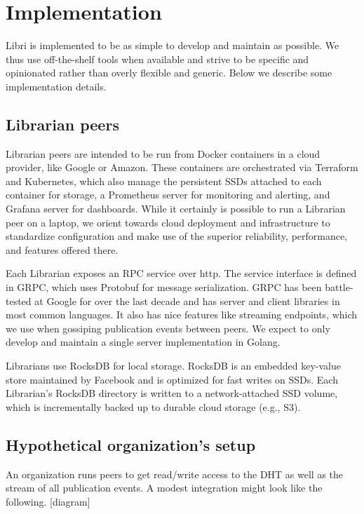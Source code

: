\documentclass[10pt]{article}
\begin{document}
\section{Implementation}
\label{sec:impl}

Libri is implemented to be as simple to develop and maintain as possible. We thus use off-the-shelf tools when available and strive to be specific and opinionated rather than overly flexible and generic. Below we describe some implementation details. 

\subsection{Librarian peers}
Librarian peers are intended to be run from Docker containers in a cloud provider, like Google or Amazon. These containers are orchestrated via Terraform and Kubernetes, which also manage the persistent SSDs attached to each container for storage, a Prometheus server for monitoring and alerting, and Grafana server for dashboards. While it certainly is possible to run a Librarian peer on a laptop, we orient towards cloud deployment and infrastructure to standardize configuration and make use of the superior reliability, performance, and features offered there. 

Each Librarian exposes an RPC service over http. The service interface is defined in GRPC, which uses Protobuf for message serialization. GRPC has been battle-tested at Google for over the last decade and has server and client libraries in most common languages. It also has nice features like streaming endpoints, which we use when gossiping publication events between peers. We expect to only develop and maintain a single server implementation in Golang. 

Librarians use RocksDB for local storage. RocksDB is an embedded key-value store maintained by Facebook and is optimized for fast writes on SSDs. Each Librarian's RocksDB directory is written to a network-attached SSD volume, which is incrementally backed up to durable cloud storage (e.g., S3). 


\subsection{Hypothetical organization's setup}

An organization runs peers to get read/write access to the DHT as well as the stream of all publication events. A modest integration might look like the following. [diagram]
\end{document}
